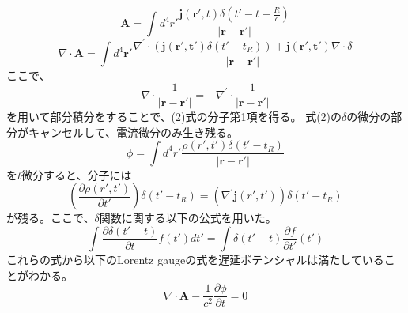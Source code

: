 \documentclass{jarticle}
\title{}
\author{}
\begin{document}
\maketitle

\begin{equation}
\bm{A} = \int d^4r' \frac{\bm{j}(\bm{r'},t)\delta(t'-t-\frac{R}{c})}{|\bm{r}-\bm{r'}|}
\end{equation}
\begin{equation}
\nabla \cdot \bm{A} = \int d^4\bm{r'} \frac{\nabla^\prime\cdot(\bm{j(r',t')}\delta(t'-t_R)) + \bm{j(r',t')}\nabla\cdot\delta}{|\bm{r}-\bm{r'}|}
\end{equation}
ここで、
\begin{equation}
\nabla\cdot\frac{1}{|\bm{r}-\bm{r'}|}=-\nabla^\prime\cdot\frac{1}{|\bm{r}-\bm{r'}|}
\end{equation}
を用いて部分積分をすることで、(2)式の分子第1項を得る。
式(2)の$\delta$の微分の部分がキャンセルして、電流微分のみ生き残る。
\begin{equation}
\phi = \int d^4 r' \frac{\rho(r',t')\delta(t'-t_R)}{|\bm{r}-\bm{r'}|}
\end{equation}
を$t$微分すると、分子には
\begin{equation}
(\frac{\partial \rho(r',t')}{\partial t'})\delta(t'-t_R) =
(\nabla^\prime\bm{j}(r',t'))\delta(t'-t_R)
\end{equation}
が残る。ここで、$\delta$関数に関する以下の公式を用いた。
\begin{equation}
\int \frac{\partial \delta(t'-t)}{\partial t}f(t')dt'=
\int \delta(t'-t)\frac{\partial f}{\partial t'}(t')
\end{equation}
これらの式から以下のLorentz gaugeの式を遅延ポテンシャルは満たしていることがわかる。
\begin{equation}
\nabla\cdot\bm{A} - \frac{1}{c^2}\frac{\partial \phi}{\partial t}=0
\end{equation}
\end{document}
